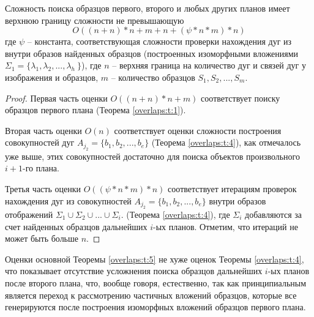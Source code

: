 \begin{theorem}
Сложность поиска образцов первого, второго и любых других планов имеет верхнюю границу сложности не превышающую  
\begin{equation}
O((n+n)*n+m+n+(\psi*n*m)*n)
\label{overlaps:11}
\end{equation}
где  $\psi$ -- константа, соответствующая сложности проверки нахождения дуг из   внутри  образов найденных образцов (построенных изоморфными вложениями $\Sigma_1  =  \{\lambda_1, \lambda_2 ,..., \lambda_h\ \}$), где  $n$ -- верхняя граница на количество дуг и связей дуг у изображения и образцов,  $m$ -- количество образцов  $S_1, S_2, ..., S_m$.
\label{overlaps:t:5}
\end{theorem}    

\begin{proof}
Первая часть оценки  $O((n+n)*n+m)$  соответствует поиску образцов первого плана (Теорема \ref{overlaps:t:1}).  

Вторая часть оценки  $O(n)$   соответствует оценки сложности построения совокупностей дуг $A_{j_2}  =  \{ b_1, b_2 ,..., b_e\}$ (Теорема \ref{overlaps:t:4}), как отмечалось уже выше, этих совокупностей достаточно для поиска объектов произвольного  $i+1$-го  плана.  

Третья часть оценки  $O((\psi*n*m)*n)$   соответствует итерациям проверок нахождения дуг из совокупностей  $A_{j_2}  =  \{ b_1, b_2 ,..., b_e\}$   внутри  образов отображений  $\Sigma_1\cup\Sigma_2\cup ...\cup \Sigma_i$. (Теорема \ref{overlaps:t:4}), где  $\Sigma_i$  добавляются за счет найденных образцов дальнейших  $i$-ых  планов.
Отметим, что итераций не может быть больше  $n$.
\end{proof}
 
\begin{remark}
Оценки основной Теоремы \ref{overlaps:t:5} не хуже   оценок Теоремы \ref{overlaps:t:4}, что показывает отсутствие усложнения поиска образцов дальнейших $i$-ых  планов после второго плана, что, вообще говоря, естественно, так как принципиальным является переход к рассмотрению частичных вложений образцов, которые все генерируются после построения изоморфных вложений образцов первого плана.
\end{remark}

